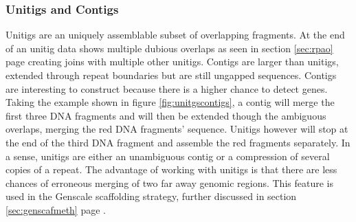 \documentclass[12pt]{article}
\newcommand*{\fulleref}[1]{section \hyperref[{#1}] {\ref*{#1}} page {\pageref{#1}}}%
\begin{document}
\subsubsection{Unitigs and Contigs} \label{sec:conuni}
Unitigs are an uniquely assemblable subset of overlapping fragments. At the end of an unitig data shows multiple dubious overlaps as seen in \fulleref{sec:rpao} creating joins with multiple other unitigs. Contigs are larger than unitigs, extended through repeat boundaries but are still ungapped sequences. Contigs are interesting to construct because there is a higher chance to detect genes. 
Taking the example shown in figure \ref{fig:unitgscontigs}, a contig will merge the first three DNA fragments and will then be extended though the ambiguous overlaps, merging the red DNA fragments' sequence. Unitigs however will stop at the end of the third DNA fragment and assemble the red fragments separately. In a sense, unitigs are either an unambiguous contig or a compression of several copies of a repeat. The advantage of working with unitigs is that there are less chances of erroneous merging of two far away genomic regions. This feature is used in the Genscale scaffolding strategy, further discussed in \fulleref{sec:genscafmeth}.
\end{document}
